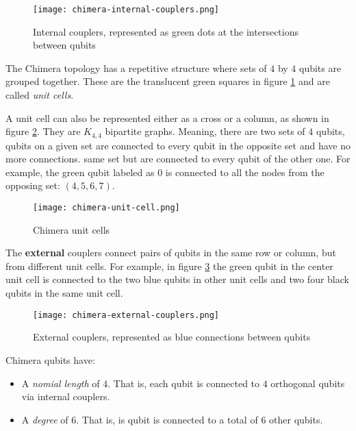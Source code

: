 \begin{figure}[H]
	\texttt{[image: chimera-internal-couplers.png]}
	\centering
	\caption{Internal couplers, represented as green dots at the intersections between qubits \cite{DWaveDoc-Architecture}}
	\label{fig:chimera-internal-couplers}
\end{figure}

The Chimera topology has a repetitive structure where sets of $4$ by $4$ qubits are grouped together. These are the translucent green squares in figure \ref{fig:chimera-internal-couplers} and are called \emph{unit cells}.

A unit cell can also be represented either as a cross or a column, as shown in figure \ref{fig:chimera-unit-cell}. They are $K_{4,4}$ bipartite graphs. Meaning, there are two sets of $4$ qubits, qubits on a given set are connected to every qubit in the opposite set and have no more connections. same set but are connected to every qubit of the other one. For example, the green qubit labeled as $0$ is connected to all the nodes from the opposing set: $(4,5,6,7)$.

\begin{figure}[h]
	\texttt{[image: chimera-unit-cell.png]}
	\centering
	\caption{Chimera unit cells \cite{DWaveDoc-Architecture}}
	\label{fig:chimera-unit-cell}
\end{figure}

The \textbf{external} couplers connect pairs of qubits in the same row or column, but from different unit cells. For example, in figure \ref{fig:chimera-external-couplers} the green qubit in the center unit cell is connected to the two blue qubits in other unit cells and two four black qubits in the same unit cell.

\begin{figure}[h]
	\texttt{[image: chimera-external-couplers.png]}
	\centering
	\caption{External couplers, represented as blue connections between qubits \cite{DWaveDoc-Architecture}}
	\label{fig:chimera-external-couplers}
\end{figure}

Chimera qubits have:

\begin{itemize}
	\item A \emph{nomial length} of $4$. That is, each qubit is connected to $4$ orthogonal qubits via internal couplers.
	\item A \emph{degree} of $6$. That is, is qubit is connected to a total of $6$ other qubits.
\end{itemize}

